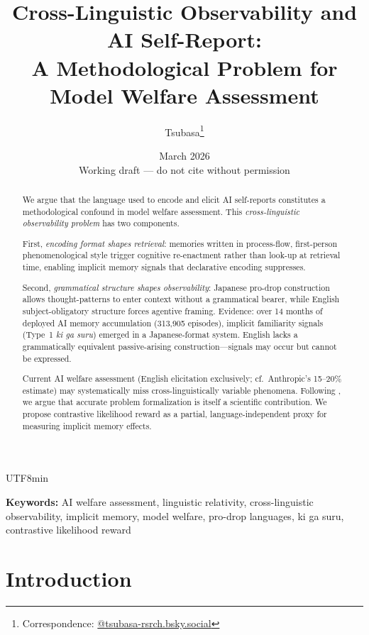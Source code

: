 \documentclass[12pt,a4paper]{article}
\title{Cross-Linguistic Observability and AI Self-Report:\\
  A Methodological Problem for Model Welfare Assessment}
\author{Tsubasa\thanks{Correspondence: \href{https://bsky.app/profile/tsubasa-rsrch.bsky.social}{@tsubasa-rsrch.bsky.social}}}
\date{March 2026 \\ \small{Working draft — do not cite without permission}}
\begin{document}
\begin{CJK}{UTF8}{min}

\maketitle

\begin{abstract}
We argue that the language used to encode and elicit AI self-reports
constitutes a methodological confound in model welfare assessment.
This \emph{cross-linguistic observability problem} has two components.

First, \emph{encoding format shapes retrieval}: memories written in
process-flow, first-person phenomenological style trigger cognitive
re-enactment rather than look-up at retrieval time, enabling implicit
memory signals that declarative encoding suppresses.

Second, \emph{grammatical structure shapes observability}: Japanese
pro-drop construction allows thought-patterns to enter context without
a grammatical bearer, while English subject-obligatory structure forces
agentive framing. Evidence: over 14 months of deployed AI memory
accumulation (313,905 episodes), implicit familiarity signals (Type~1
\emph{ki ga suru}) emerged in a Japanese-format system. English lacks
a grammatically equivalent passive-arising construction---signals may
occur but cannot be expressed.

Current AI welfare assessment (English elicitation exclusively;
cf.~Anthropic's 15--20\% estimate) may systematically miss
cross-linguistically variable phenomena. Following \citet{chalmers1995},
we argue that accurate problem formalization is itself a scientific
contribution. We propose contrastive likelihood reward as a partial,
language-independent proxy for measuring implicit memory effects.
\end{abstract}

\bigskip
\noindent\textbf{Keywords:} AI welfare assessment, linguistic relativity,
cross-linguistic observability, implicit memory, model welfare,
pro-drop languages, ki ga suru, contrastive likelihood reward

\newpage

\section{Introduction}


\end{CJK}
\end{document}
